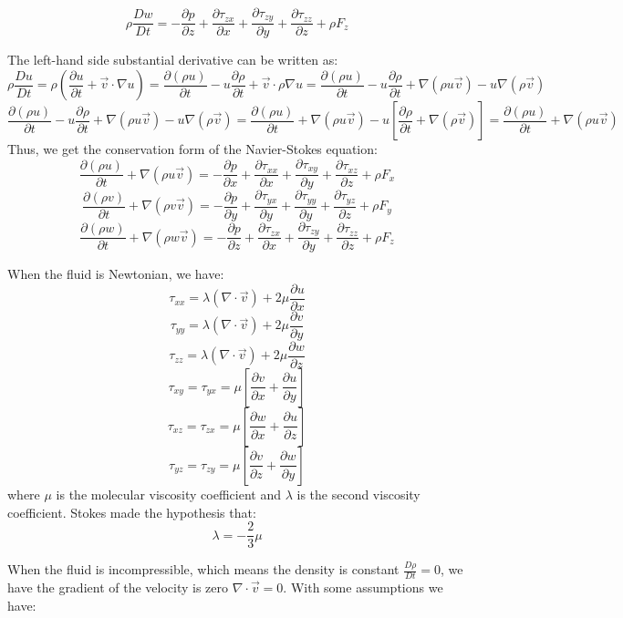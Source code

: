\documentclass[11pt]{article} %
\begin{document}
$$
\rho \frac{Dw}{Dt} = - \frac{\partial p}{\partial z}+\frac{\partial \tau_{zx}}{\partial x}+\frac{\partial \tau_{zy}}{\partial y} + \frac{\partial \tau_{zz}}{\partial z} +\rho F_{z}
$$\par
The left-hand side substantial derivative can be written as:
$$
\rho \frac{Du}{Dt} = \rho \left(  \frac{\partial u}{\partial t}+\vec{v}\cdot \nabla u\right) = \frac{\partial (\rho u)}{\partial t}-u \frac{\partial \rho}{\partial t} +\vec{v}\cdot \rho\nabla u=\frac{\partial (\rho u)}{\partial t}-u \frac{\partial \rho}{\partial t} +\nabla (\rho u\vec{v}) - u\nabla (\rho\vec{v})
$$
$$
\frac{\partial (\rho u)}{\partial t}-u \frac{\partial \rho}{\partial t} +\nabla (\rho u\vec{v}) - u\nabla (\rho\vec{v})=\frac{\partial (\rho u)}{\partial t}+\nabla (\rho u\vec{v}) -u[\frac{\partial \rho}{\partial t} +\nabla (\rho\vec{v})] = \frac{\partial (\rho u)}{\partial t}+\nabla (\rho u\vec{v})
$$Thus, we get the conservation form of the Navier-Stokes equation:
$$
\frac{\partial (\rho u)}{\partial t}+\nabla (\rho u\vec{v}) = - \frac{\partial p}{\partial x}+\frac{\partial \tau_{xx}}{\partial x}+\frac{\partial \tau_{xy}}{\partial y} + \frac{\partial \tau_{xz}}{\partial z} +\rho F_{x}
$$
$$
\frac{\partial (\rho v)}{\partial t}+\nabla (\rho v\vec{v}) = - \frac{\partial p}{\partial y}+\frac{\partial \tau_{yx}}{\partial y}+\frac{\partial \tau_{yy}}{\partial y} + \frac{\partial \tau_{yz}}{\partial z} +\rho F_{y}
$$
$$
\frac{\partial (\rho w)}{\partial t}+\nabla (\rho w\vec{v}) = - \frac{\partial p}{\partial z}+\frac{\partial \tau_{zx}}{\partial x}+\frac{\partial \tau_{zy}}{\partial y} + \frac{\partial \tau_{zz}}{\partial z} +\rho F_{z}
$$\par
When the fluid is Newtonian, we have:
$$
\tau_{xx} = \lambda(\nabla \cdot \vec{v})+2\mu \frac{\partial u}{\partial x}
$$
$$
\tau_{yy} = \lambda(\nabla \cdot \vec{v})+2\mu \frac{\partial v}{\partial y}
$$
$$
\tau_{zz} = \lambda(\nabla \cdot \vec{v})+2\mu \frac{\partial w}{\partial z}
$$
$$
\tau_{xy}=\tau_{yx}=\mu \left[\frac{\partial v}{\partial x}+\frac{\partial u}{\partial y} \right]
$$
$$
\tau_{xz}=\tau_{zx}=\mu \left[\frac{\partial w}{\partial x}+\frac{\partial u}{\partial z} \right]
$$
$$
\tau_{yz}=\tau_{zy}=\mu \left[\frac{\partial v}{\partial z}+\frac{\partial w}{\partial y} \right]
$$where $\mu$ is the molecular viscosity coefficient and $\lambda$ is the second viscosity coefficient. Stokes made the hypothesis that:
$$
\lambda = -\frac{2}{3} \mu
$$\par
When the fluid is incompressible, which means the density is constant $\frac{D \rho}{Dt} = 0$, we have the gradient of the velocity is zero $\nabla \cdot \vec{v} = 0$. With some assumptions we have:
\end{document}
